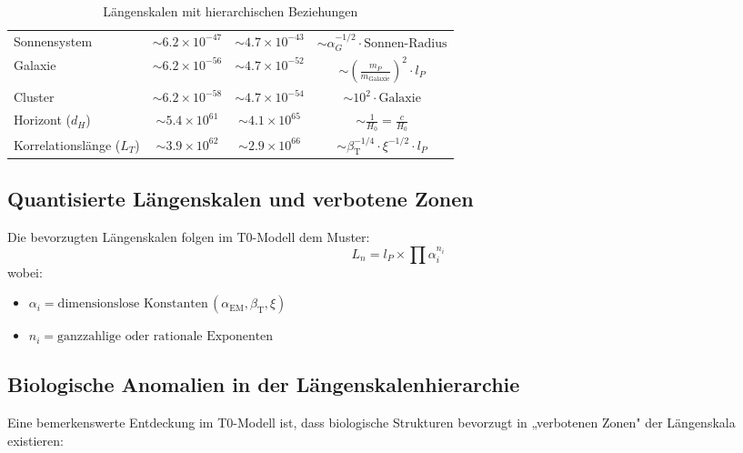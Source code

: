 \documentclass[12pt,a4paper]{article}
\newcommand{\alphaEM}{\alpha_{\text{EM}}}
\newcommand{\betaT}{\beta_{\text{T}}}
\begin{document}
\begin{table}[H]
\begin{adjustbox}{width=\textwidth}
\begin{tabular}{lccc}
				Sonnensystem & \(\sim 6.2 \times 10^{-47}\) & \(\sim 4.7 \times 10^{-43}\) & \(\sim \alpha_G^{-1/2} \cdot \text{Sonnen-Radius}\) \\
				Galaxie & \(\sim 6.2 \times 10^{-56}\) & \(\sim 4.7 \times 10^{-52}\) & \(\sim \left(\frac{m_P}{m_{\mathrm{Galaxie}}}\right)^2 \cdot l_P\) \\
				Cluster & \(\sim 6.2 \times 10^{-58}\) & \(\sim 4.7 \times 10^{-54}\) & \(\sim 10^2 \cdot \text{Galaxie}\) \\
				Horizont (\(d_H\)) & \(\sim 5.4 \times 10^{61}\) & \(\sim 4.1 \times 10^{65}\) & \(\sim \frac{1}{H_0} = \frac{c}{H_0}\) \\
				Korrelationslänge (\(L_T\)) & \(\sim 3.9 \times 10^{62}\) & \(\sim 2.9 \times 10^{66}\) & \(\sim \betaT^{-1/4} \cdot \xi^{-1/2} \cdot l_P\) \\
				\bottomrule
			\end{tabular}
		\end{adjustbox}
		\caption{Längenskalen mit hierarchischen Beziehungen}
		\label{tab:laengenskalen}
	\end{table}
	
	\subsection*{Quantisierte Längenskalen und verbotene Zonen}
	
	Die bevorzugten Längenskalen folgen im T0-Modell dem Muster:
	\[
	L_n = l_P \times \prod \alpha_i^{n_i}
	\]
	wobei:
	\begin{itemize}
		\item \(\alpha_i = \text{dimensionslose Konstanten} \, (\alphaEM, \betaT, \xi)\)
		\item \(n_i = \text{ganzzahlige oder rationale Exponenten}\)
	\end{itemize}
	
	\subsection*{Biologische Anomalien in der Längenskalenhierarchie}
	
	Eine bemerkenswerte Entdeckung im T0-Modell ist, dass biologische Strukturen bevorzugt in „verbotenen Zonen" der Längenskala existieren:
	
\end{document}
